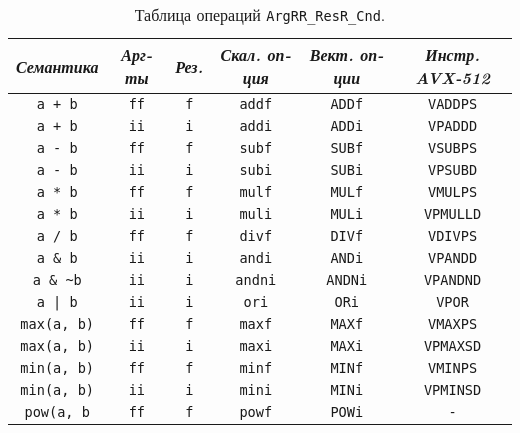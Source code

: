 \documentclass[a4paper,12pt]{extarticle}                     %
\numberwithin{equation}{section}                             %
\numberwithin{figure}{section}                               %
\numberwithin{table}{section}                                %
\theoremstyle{plain}                                         %
\numberwithin{theorem}{section}                              %
\numberwithin{lemma}{section}                                %
\numberwithin{definition}{section}                           %
\begin{document}
\begin{table}[!h]
\setcaptionmargin{0mm}
\onelinecaptionsfalse
{}
\caption{Таблица операций \texttt{ArgRR\_ResR\_Cnd}.}
\bigskip
\begin{tabular}{|c|c|c|c|c|c|}
\hline
\textit{Семантика} & \textit{Арг-ты} & \textit{Рез.} & \textit{Скал. оп-ция} & \textit{Вект. оп-ции} & \textit{Инстр. AVX-512} \\
\hline
\texttt{a + b}      & \texttt{ff} & \texttt{f} & \texttt{addf}  & \texttt{ADDf}  & \texttt{VADDPS} \\
\texttt{a + b}      & \texttt{ii} & \texttt{i} & \texttt{addi}  & \texttt{ADDi}  & \texttt{VPADDD} \\
\texttt{a - b}      & \texttt{ff} & \texttt{f} & \texttt{subf}  & \texttt{SUBf}  & \texttt{VSUBPS} \\
\texttt{a - b}      & \texttt{ii} & \texttt{i} & \texttt{subi}  & \texttt{SUBi}  & \texttt{VPSUBD} \\
\texttt{a * b}      & \texttt{ff} & \texttt{f} & \texttt{mulf}  & \texttt{MULf}  & \texttt{VMULPS} \\
\texttt{a * b}      & \texttt{ii} & \texttt{i} & \texttt{muli}  & \texttt{MULi}  & \texttt{VPMULLD} \\
\texttt{a / b}      & \texttt{ff} & \texttt{f} & \texttt{divf}  & \texttt{DIVf}  & \texttt{VDIVPS} \\
\texttt{a \& b}     & \texttt{ii} & \texttt{i} & \texttt{andi}  & \texttt{ANDi}  & \texttt{VPANDD} \\
\texttt{a \& \~{}b} & \texttt{ii} & \texttt{i} & \texttt{andni} & \texttt{ANDNi} & \texttt{VPANDND} \\
\texttt{a | b}      & \texttt{ii} & \texttt{i} & \texttt{ori}   & \texttt{ORi}   & \texttt{VPOR} \\
\texttt{max(a, b)}  & \texttt{ff} & \texttt{f} & \texttt{maxf}  & \texttt{MAXf}  & \texttt{VMAXPS} \\
\texttt{max(a, b)}  & \texttt{ii} & \texttt{i} & \texttt{maxi}  & \texttt{MAXi}  & \texttt{VPMAXSD} \\
\texttt{min(a, b)}  & \texttt{ff} & \texttt{f} & \texttt{minf}  & \texttt{MINf}  & \texttt{VMINPS} \\
\texttt{min(a, b)}  & \texttt{ii} & \texttt{i} & \texttt{mini}  & \texttt{MINi}  & \texttt{VPMINSD} \\
\texttt{pow(a, b}   & \texttt{ff} & \texttt{f} & \texttt{powf}  & \texttt{POWi}  & \texttt{-} \\
\hline
\end{tabular}
\end{table}
\end{document}

